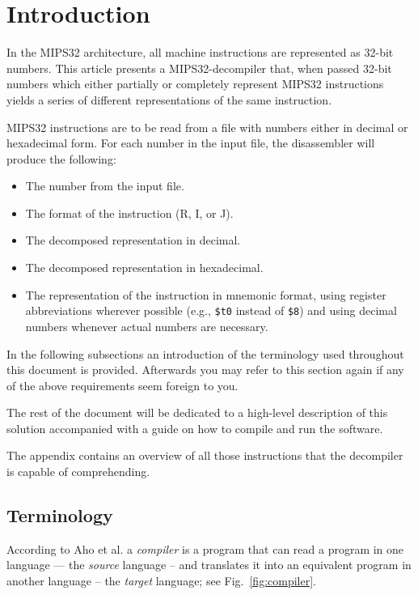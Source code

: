 \section{Introduction}

In the MIPS32 architecture, all machine instructions are represented
as 32-bit numbers. This article presents a MIPS32-decompiler that,
when passed 32-bit numbers which either partially or completely
represent MIPS32 instructions yields a series of different
representations of the same instruction.

MIPS32 instructions are to be read from a file with numbers either in
decimal or hexadecimal form. For each number in the input file, the
disassembler will produce the following:

\begin{itemize}
  \item The number from the input file.
  \item The format of the instruction (R, I, or J).
  \item The decomposed representation in decimal.
  \item The decomposed representation in hexadecimal.
  \item The representation of the instruction in mnemonic format,
    using register abbreviations wherever possible (e.g.,
    \texttt{\$t0} instead of \texttt{\$8}) and using decimal numbers
    whenever actual numbers are necessary.
\end{itemize}

In the following subsections an introduction of the terminology used
throughout this document is provided. Afterwards you may refer to this
section again if any of the above requirements seem foreign to you.

The rest of the document will be dedicated to a high-level description
of this solution accompanied with a guide on how to compile and run
the software.

The appendix contains an overview of all those instructions that the
decompiler is capable of comprehending.

\subsection{Terminology}

According to Aho et al.\cite{Aho:2006:CPT:1177220} a \emph{compiler}
is a program that can read a program in one language --- the
\emph{source} language -- and translates it into an equivalent program
in another language -- the \emph{target} language; see
Fig.~\ref{fig:compiler}.

